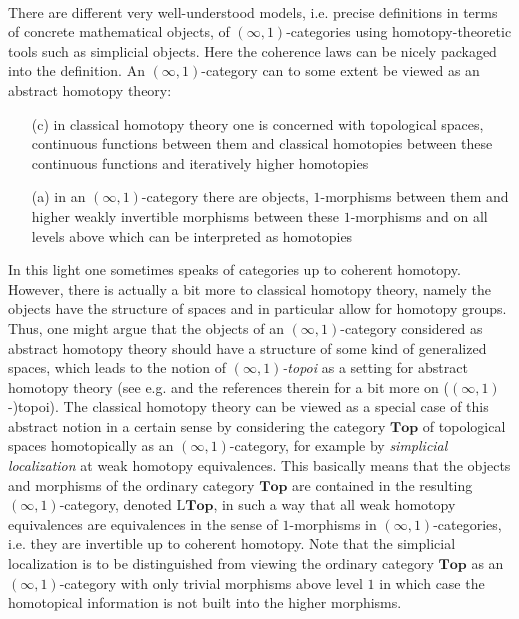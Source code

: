 \\
There are different very well-understood models, i.e. precise definitions in terms of concrete mathematical objects, of $(\infty,1)$-categories using homotopy-theoretic tools such as simplicial objects. Here the coherence laws can be nicely packaged into the definition. An $(\infty,1)$-category can to some extent be viewed as an abstract homotopy theory:
\begin{enumerate}
\item[(c)]
in classical homotopy theory one is concerned with topological spaces, continuous functions between them and classical homotopies between these continuous functions and iteratively higher homotopies

\item[(a)]
in an $(\infty,1)$-category there are objects, $1$-morphisms between them and higher weakly invertible morphisms between these $1$-morphisms and on all levels above which can be interpreted as homotopies
\end{enumerate}
In this light one sometimes speaks of categories up to coherent homotopy. However, there is actually a bit more to classical homotopy theory, namely the objects have the structure of spaces and in particular allow for homotopy groups. Thus, one might argue that the objects of an $(\infty,1)$-category considered as abstract homotopy theory should have a structure of some kind of generalized spaces, which leads to the notion of \textit{$(\infty,1)$-topoi} as a setting for abstract homotopy theory (see e.g. \cite{00000001} and the references therein for a bit more on ($(\infty,1)$-)topoi). The classical homotopy theory can be viewed as a special case of this abstract notion in a certain sense by considering the category $\mathbf{Top}$ of topological spaces homotopically as an $(\infty,1)$-category, for example by \textit{simplicial localization} at weak homotopy equivalences. This basically means that the objects and morphisms of the ordinary category $\mathbf{Top}$ are contained in the resulting $(\infty,1)$-category, denoted $\mathrm{L}\mathbf{Top}$, in such a way that all weak homotopy equivalences are equivalences in the sense of $1$-morphisms in $(\infty,1)$-categories, i.e. they are invertible up to coherent homotopy. Note that the simplicial localization is to be distinguished from viewing the ordinary category $\mathbf{Top}$ as an $(\infty,1)$-category with only trivial morphisms above level $1$ in which case the homotopical information is not built into the higher morphisms.
\\
